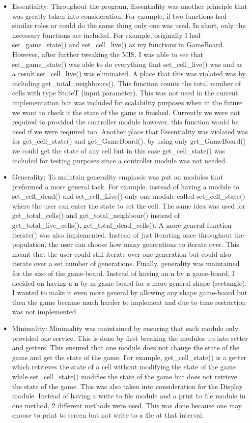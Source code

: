 \documentclass[12pt]{article}
\begin{document}
\begin{itemize}
\item Essentiality: Throughout the program, Essentiality was another principle that was greatly taken into consideration. For example, if two functions had similar roles or could do the same thing only one was used. In short, only the necessary functions are included. For example, originally I had set\_game\_state() and set\_cell\_live() as my functions in GameBoard. However, after further tweaking the MIS, I was able to see that set\_game\_state() was able to do everything that set\_cell\_live() was and as a result set\_cell\_live() was eliminated. A place that this was violated was by including get\_total\_neighbours(). This function counts the total number of cells with type StateT (input parameter). This was not used in the current implementation but was included for scalability purposes when in the future we want to check if the state of the game is finished. Currently we were not required to provided the controller module however, this function would be used if we were required too. Another place that Essentiality was violated was for get\_cell\_state() and get\_GameBoard(). by using only get\_GameBoard() we could get the state of any cell but in this case get\_cell\_state() was included for testing purposes since a controller module was not needed.

\item Generality: To maintain generality emphasis was put on modules that preformed a more general task. For example, instead of having a module to set\_cell\_dead() and set\_cell\_Live() only one module called set\_cell\_state() where the user can enter the state to set the cell. The same idea was used for get\_total\_cells() and get\_total\_neighbour() instead of get\_total\_live\_cells(), get\_total\_dead\_cells(). A more general function iterate() was also implemented. Instead of just iterating once throughout the population, the user can choose how many generations to iterate over. This meant that the user could still iterate over one generation but could also iterate over a set number of generations. Finally, generality was maintained for the size of the game-board. Instead of having an n by n game-board, I decided on having a n by m game-board for a more general shape (rectangle). I wanted to make it even more general by allowing any shape game-board but then the game became much harder to implement and due to time restriction was not implemented.

\item Minimality: Minimality was maintained by ensuring that each module only provided one service. This is done by first breaking the modules up into setter and getters. This ensured that one module does not change the state of the game and get the state of the game. For example, get\_cell\_state() is a getter which retrieves the state of a cell without modifying the state of the game while set\_cell\_state() modifies the state of the game but does not retrieve the state of the game. This was also taken into consideration for the Display module. Instead of having a write to file module and a print to file module in one method, 2 different methods were used. This was done because one may choose to print to screen but not write to a file at that interval. 


\end{itemize}
\end{document}
